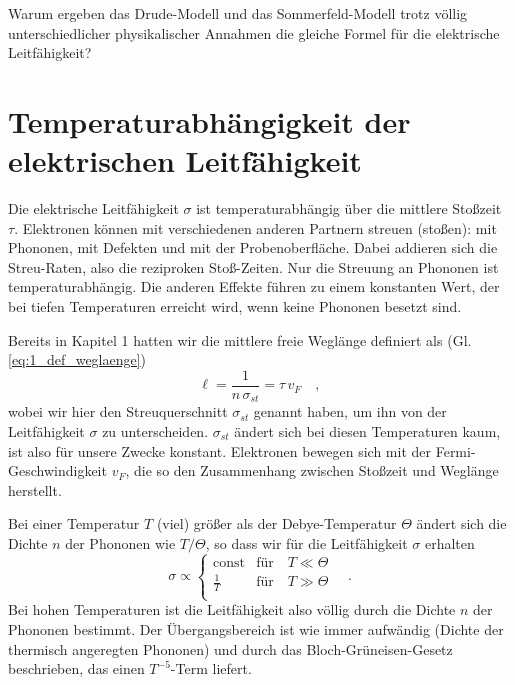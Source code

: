 \begin{questions} 
    \item Warum ergeben das Drude-Modell und das Sommerfeld-Modell trotz völlig unterschiedlicher physikalischer Annahmen die gleiche Formel für die elektrische Leitfähigkeit?
\end{questions}



\section{Temperaturabhängigkeit der elektrischen Leitfähigkeit}

Die elektrische Leitfähigkeit $\sigma$ ist temperaturabhängig über die mittlere Stoßzeit $\tau$. Elektronen können mit verschiedenen anderen Partnern streuen (stoßen): mit Phononen, mit Defekten und mit der Probenoberfläche. Dabei addieren sich die Streu-Raten, also die reziproken Stoß-Zeiten. Nur die Streuung an Phononen ist temperaturabhängig. Die anderen Effekte führen zu einem konstanten Wert, der bei tiefen Temperaturen erreicht wird, wenn keine Phononen besetzt sind.

Bereits in Kapitel 1 hatten wir die mittlere freie Weglänge definiert als (Gl. \ref{eq:1_def_weglaenge})
\begin{equation}
   \ell = \frac{1}{n \, \sigma_{st}} = \tau \, v_F \quad ,
\end{equation}
wobei wir hier den Streuquerschnitt $\sigma_{st}$ genannt haben, um ihn von der Leitfähigkeit $\sigma$ zu unterscheiden. $\sigma_{st}$ ändert sich bei diesen Temperaturen kaum, ist also für unsere Zwecke konstant. Elektronen bewegen sich mit der Fermi-Geschwindigkeit $v_F$, die so den Zusammenhang zwischen Stoßzeit und Weglänge herstellt.

Bei einer Temperatur $T$ (viel) größer als der Debye-Temperatur $\Theta$ ändert sich die Dichte $n$ der Phononen wie $T/\Theta$, so dass wir für die Leitfähigkeit $\sigma$ erhalten
\begin{equation}
   \sigma \propto \left\{ 
      \begin{matrix}
         \text{const} & \text{für} \quad T \ll \Theta \\
   \frac{1}{T} &  \text{für} \quad T \gg \Theta \\
      \end{matrix}
   \right.  \quad .
\end{equation}
Bei hohen Temperaturen ist die Leitfähigkeit also völlig durch die Dichte $n$ der Phononen bestimmt.
Der Übergangsbereich ist wie immer aufwändig (Dichte der thermisch angeregten Phononen) und durch das Bloch-Grüneisen-Gesetz beschrieben, das einen $T^{-5}$-Term liefert.


